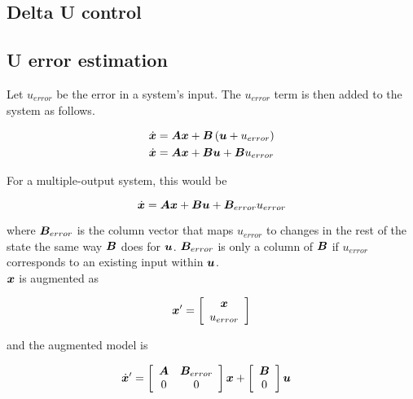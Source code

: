 \subsection{Delta U control}

\subsection{U error estimation}

Let $u_{error}$ be the error in a system's input. The $u_{error}$ term is then
added to the system as follows.

\begin{align*}
  \dot{\bm x} &= \bm A\bm x + \bm B\left(\bm u + u_{error}\right) \\
  \dot{\bm x} &= \bm A\bm x + \bm B\bm u + \bm Bu_{error}
\end{align*}

For a multiple-output system, this would be

\begin{equation*}
  \dot{\bm x} = \bm A\bm x + \bm B\bm u + \bm B_{error}u_{error}
\end{equation*}

where $\bm B_{error}$ is the column vector that maps $u_{error}$ to changes in
the rest of the state the same way $\bm B$ does for $\bm u$.
$\bm B_{error}$ is only a column of $\bm B$ if $u_{error}$ corresponds to an
existing input within $\bm u$. \\

$\bm x$ is augmented as

\begin{equation*}
  \bm x' = \left[
  \begin{array}{c}
    \bm x \\
    u_{error}
  \end{array}
  \right]
\end{equation*}

and the augmented model is

\begin{align*}
  \dot{\bm x}' &= \left[
  \begin{array}{cc}
    \bm A & \bm B_{error} \\
    0 & 0
  \end{array}
  \right] \bm x + \left[
  \begin{array}{c}
    \bm B \\
    0
  \end{array}
  \right] \bm u
\end{align*}

